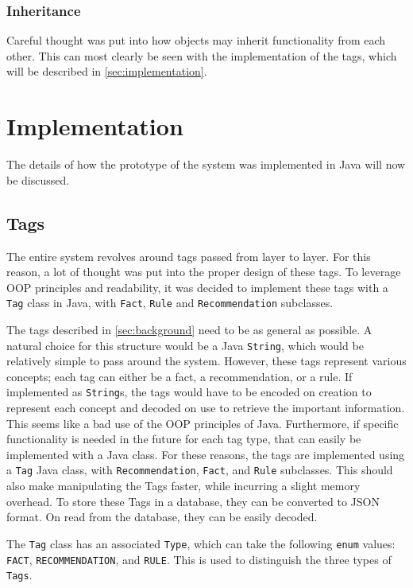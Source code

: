\documentclass[titlepage,11pt]{article}
\newcommand{\code}[1]{\texttt{#1}}
\begin{document}
\subsubsection{Inheritance}

Careful thought was put into how objects may inherit functionality from each other. This can most clearly be seen with the implementation of the tags, which will be described in \autoref{sec:implementation}.

\section{Implementation}
\label{sec:implementation}

The details of how the prototype of the system was implemented in Java will now be discussed.

\subsection{Tags}

The entire system revolves around tags passed from layer to layer. For this reason, a lot of thought was put into the proper design of these tags. To leverage OOP principles and readability, it was decided to implement these tags with a \code{Tag} class in Java, with \code{Fact}, \code{Rule} and \code{Recommendation} subclasses.

The tags described in \autoref{sec:background} need to be as general as possible. A natural choice for this structure would be a Java \code{String}, which would be relatively simple to pass around the system. However, these tags represent various concepts; each tag can either be a fact, a recommendation, or a rule. If implemented as \code{String}s, the tags would have to be encoded on creation to represent each concept and decoded on use to retrieve the important information. This seems like a bad use of the OOP principles of Java. Furthermore, if specific functionality is needed in the future for each tag type, that can easily be implemented with a Java class. For these reasons, the tags are implemented using a \code{Tag} Java class, with \code{Recommendation}, \code{Fact}, and \code{Rule} subclasses. This should also make manipulating the Tags faster, while incurring a slight memory overhead. To store these Tags in a database, they can be converted to JSON format. On read from the database, they can be easily decoded.

The \code{Tag} class has an associated \code{Type}, which can take the following \code{enum} values: \code{FACT}, \code{RECOMMENDATION}, and \code{RULE}. This is used to distinguish the three types of \code{Tags}.
\end{document}
